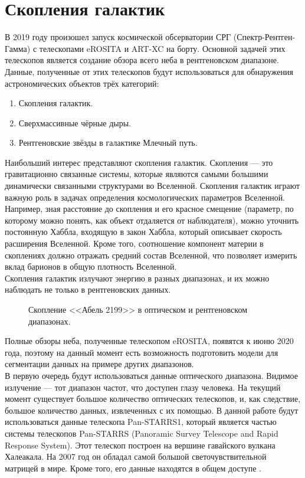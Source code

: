 \Introduction
\section{Скопления галактик}
В 2019 году произошел запуск космической обсерватории СРГ (Спектр-Рентген-Гамма) с телескопами 
eROSITA и ART-XC на борту. Основной задачей этих телескопов является создание обзора всего неба в 
рентгеновском диапазоне. Данные, полученные от этих телескопов будут использоваться для обнаружения 
астрономических объектов трёх категорий:

\begin{enumerate}
    \item Скопления галактик.
    \item Сверхмассивные чёрные дыры.
    \item Рентгеновские звёзды в галактике Млечный путь. 
\end{enumerate}

Наибольший интерес представляют скопления галактик. Скопления --- это гравитационно связанные 
системы, которые являются самыми большими динамически связанными структурами во Вселенной. 
Скопления галактик играют важную роль в задачах определения космологических параметров Вселенной. 
Например, зная расстояние до скопления и его красное смещение (параметр, по которому можно понять, 
как объект отдаляется от наблюдателя), можно уточнить постоянную Хаббла, входящую в закон Хаббла, 
который описывает скорость расширения Вселенной. Кроме того, соотношение компонент материи в 
скоплениях должно отражать средний состав Вселенной, что позволяет измерить вклад барионов в общую
плотность Вселенной.\\
Скопления галактик излучают энергию в разных диапазонах, и 
их можно наблюдать не только в рентгеновских данных.\\

\begin{figure}[h]
    \caption{Скопление <<Абель 2199>> в оптическом и рентгеновском диапазонах. \cite{Abell}}
\end{figure}

Полные обзоры неба, полученные телескопом eROSITA, появятся к июню 2020 года, поэтому на данный 
момент есть возможность подготовить модели для сегментации данных на примере других диапазонов.\\

В первую очередь будут использоваться данные оптического диапазона. Видимое излучение --- тот 
диапазон частот, что доступен глазу человека. На текущий момент существует большое количество 
оптических телескопов, и, как следствие, большое количество данных, извлеченных с их помощью. В 
данной работе будут использоваться данные телескопа Pan-STARRS1, который является частью системы 
телескопов Pan-STARRS (Panoramic Survey Telescope and Rapid Response System). Этот телескоп 
построен на вершине гавайского вулкана Халеакала. На 2007 год он обладал самой большой 
светочувствительной матрицей в мире. Кроме того, его данные находятся в общем доступе \cite{Panstarrs}.\\

